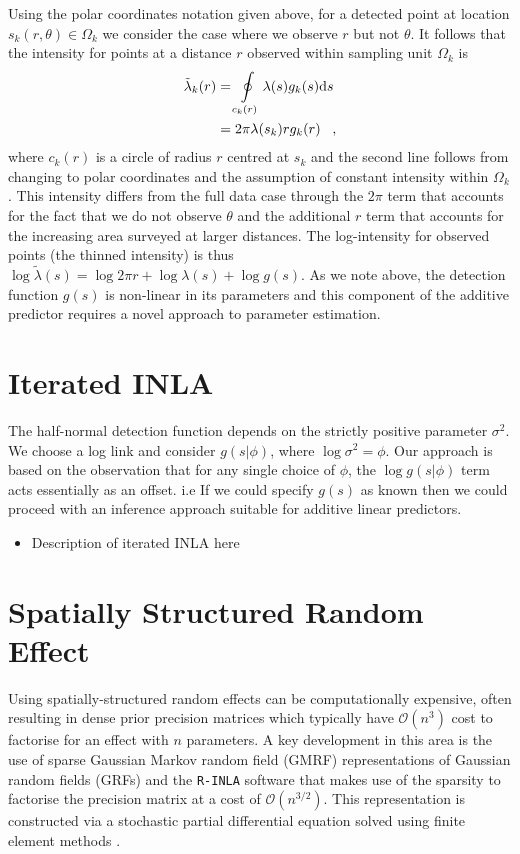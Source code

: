 \documentclass[preprint,12pt]{elsarticle}
\newcommand{\tl}{\tilde{\lambda}}   %
\begin{document}
Using the polar coordinates notation given above, for a detected point at location $s_k(r, \theta) \in \Omega_k$ we consider the case where we observe $r$ but not $\theta$.  It follows that the intensity for points at a distance $r$ observed within sampling unit $\Omega_k$ is
\begin{align}
\label{intensity-incomplete}
\tl_k(r) &= \oint\displaylimits_{c_k(r)} \lambda(s)g_k(s)\mathrm{d}s \nonumber \\
&= 2\pi\lambda(s_k)rg_k(r) \;\;\; ,
\end{align}
 where $c_k(r)$ is a circle of radius $r$ centred at $s_k$ and the second line follows from changing to polar coordinates and the assumption of constant intensity within $\Omega_k$.  This intensity differs from the full data case through the $2\pi$  term that accounts for the fact that we do not observe $\theta$ and the additional $r$ term that accounts for the increasing area surveyed at larger distances.  The log-intensity for observed points (the thinned intensity) is thus $\log\tl(s) = \log 2 \pi r + \log\lambda(s) + \log g(s)$.  As we note above, the detection function $g(s)$ is non-linear in its parameters and this component of the additive predictor requires a novel approach to parameter estimation.

\section{Iterated INLA}

The half-normal detection function depends on the strictly positive parameter $\sigma^2$.  We choose a log link and consider $g(s | \phi)$, where $\log\sigma^2 = \phi$.   Our approach is based on the observation that for any single choice of $\phi$, the $\log g(s | \phi)$ term acts essentially as an offset. i.e If we could specify $g(s)$ as known then we could proceed with an inference approach suitable for additive linear predictors.

\begin{itemize}
 \item Description of iterated INLA here
\end{itemize}

\section{Spatially Structured Random Effect}
\label{GMRFexplanation}

Using spatially-structured random effects can be computationally expensive, often resulting in dense prior precision matrices which typically have $\mathcal{O}(n^3)$ cost to factorise for an effect with $n$ parameters.  A key development in this area is the use of sparse Gaussian Markov random field (GMRF) representations of Gaussian random fields (GRFs) and the \texttt{R-INLA} software that makes use of the sparsity to factorise the precision matrix at a cost of $\mathcal{O}(n^{3/2})$.  This representation is constructed via a stochastic partial differential equation solved using finite element methods \citep{lindgren_explicit_2011}.
\end{document}
